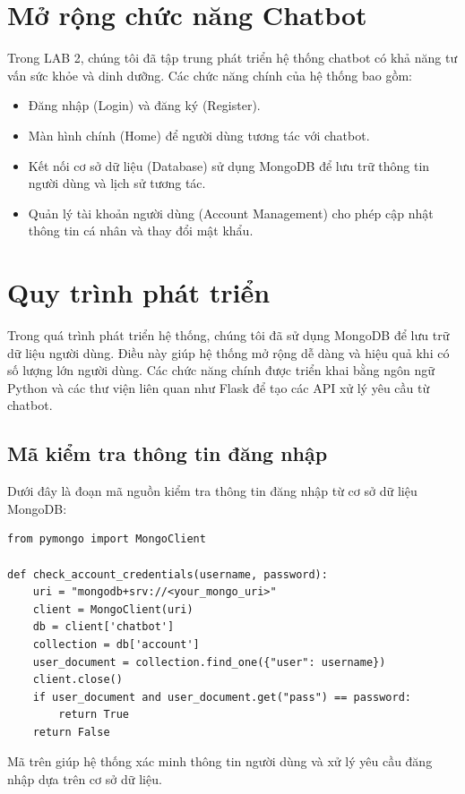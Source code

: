 \documentclass[a4paper,12pt]{report}
\begin{document}
\section{Mở rộng chức năng Chatbot}
Trong LAB 2, chúng tôi đã tập trung phát triển hệ thống chatbot có khả năng tư vấn sức khỏe và dinh dưỡng. Các chức năng chính của hệ thống bao gồm:
\begin{itemize}
    \item Đăng nhập (Login) và đăng ký (Register).
    \item Màn hình chính (Home) để người dùng tương tác với chatbot.
    \item Kết nối cơ sở dữ liệu (Database) sử dụng MongoDB để lưu trữ thông tin người dùng và lịch sử tương tác.
    \item Quản lý tài khoản người dùng (Account Management) cho phép cập nhật thông tin cá nhân và thay đổi mật khẩu.
\end{itemize}

\section{Quy trình phát triển}
Trong quá trình phát triển hệ thống, chúng tôi đã sử dụng MongoDB để lưu trữ dữ liệu người dùng. Điều này giúp hệ thống mở rộng dễ dàng và hiệu quả khi có số lượng lớn người dùng. Các chức năng chính được triển khai bằng ngôn ngữ Python và các thư viện liên quan như Flask để tạo các API xử lý yêu cầu từ chatbot.

\subsection{Mã kiểm tra thông tin đăng nhập}
Dưới đây là đoạn mã nguồn kiểm tra thông tin đăng nhập từ cơ sở dữ liệu MongoDB:

\begin{verbatim}
from pymongo import MongoClient

def check_account_credentials(username, password):
    uri = "mongodb+srv://<your_mongo_uri>"
    client = MongoClient(uri)
    db = client['chatbot']
    collection = db['account']
    user_document = collection.find_one({"user": username})
    client.close()
    if user_document and user_document.get("pass") == password:
        return True
    return False
\end{verbatim}

Mã trên giúp hệ thống xác minh thông tin người dùng và xử lý yêu cầu đăng nhập dựa trên cơ sở dữ liệu.
\end{document}
